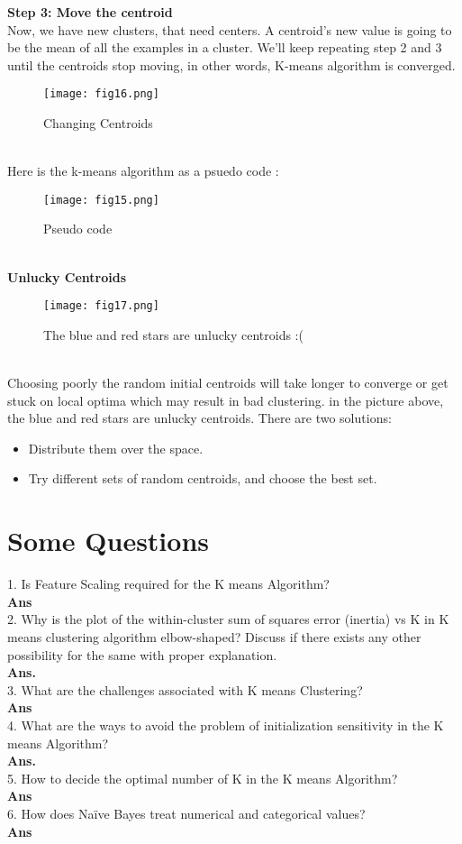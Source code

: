 \documentclass[a4paper, 11pt]{article}
\begin{document}
\textbf{Step 3: Move the centroid}\\
Now, we have new clusters, that need centers. A centroid’s new value is going to be the mean of all the examples in a cluster.
We’ll keep repeating step 2 and 3 until the centroids stop moving, in other words, K-means algorithm is converged.
\begin{figure}[h!]
    \texttt{[image: fig16.png]}
    \label{fig:fig16}
    \caption{Changing Centroids}
  \end{figure} 
  \pagebreak
\\Here is the k-means algorithm as a psuedo code :\\
\begin{figure}[h!]
    \texttt{[image: fig15.png]}
    \label{fig:fig15}
    \caption{Pseudo code}
  \end{figure} \\
\textbf{Unlucky Centroids }
\begin{figure}[h!]
    \texttt{[image: fig17.png]}
    \label{fig:fig17}
    \caption{The blue and red stars are unlucky centroids :(}
  \end{figure}
  \\Choosing poorly the random initial centroids will take longer to converge or get stuck on local optima which may result in bad clustering. in the picture above, the blue and red stars are unlucky centroids.
  There are two solutions: 
  \begin{itemize}
    \item Distribute them over the space.
    \item Try different sets of random centroids, and choose the best set.
  \end{itemize}
\pagebreak
\section{Some Questions}
1. Is Feature Scaling required for the K means Algorithm?\\
\textbf{Ans}\\
2. Why is the plot of the within-cluster sum of squares error (inertia) vs
K in K means clustering algorithm elbow-shaped? Discuss if there
exists any other possibility for the same with proper explanation. \\
\textbf{Ans.}\\
3. What are the challenges associated with K means Clustering?\\ 
\textbf{Ans} \\
4. What are the ways to avoid the problem of initialization sensitivity in
the K means Algorithm? \\
\textbf{Ans.}  \\          
5. How to decide the optimal number of K in the K means Algorithm?\\
\textbf{Ans} \\
6. How does Naïve Bayes treat numerical and categorical values? \\
\textbf{Ans} \\

\end{document}
